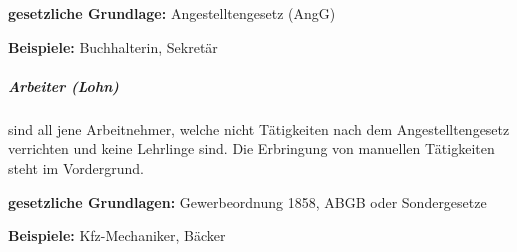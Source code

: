 \documentclass{htblagkr}
\begin{document}
    \textbf{gesetzliche Grundlage:} Angestelltengesetz (AngG)

    \textbf{Beispiele:} Buchhalterin, Sekretär

    \subparagraph{Arbeiter (Lohn)}

    sind all jene Arbeitnehmer, welche nicht Tätigkeiten nach dem Angestelltengesetz verrichten und keine Lehrlinge sind.
    Die Erbringung von manuellen Tätigkeiten steht im Vordergrund.

    \textbf{gesetzliche Grundlagen:} Gewerbeordnung 1858, ABGB oder Sondergesetze

    \textbf{Beispiele:} Kfz-Mechaniker, Bäcker
\end{document}
